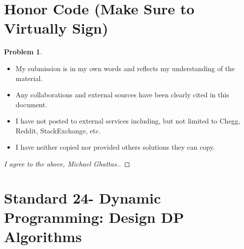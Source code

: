 \documentclass[11pt]{article}
\theoremstyle{definition}
\theoremstyle{definition}
\newtheorem{required}{Problem}
\theoremstyle{definition}
\begin{document}
\section{Honor Code (Make Sure to Virtually Sign)} \label{HonorCode}

\begin{required}
\begin{itemize}
\item My submission is in my own words and reflects my understanding of the material.
\item Any collaborations and external sources have been clearly cited in this document.
\item I have not posted to external services including, but not limited to Chegg, Reddit, StackExchange, etc.
\item I have neither copied nor provided others solutions they can copy.
\end{itemize}

\end{required}

\begin{proof}[I agree to the above, Michael Ghattas.]
\end{proof}


\newpage
\section{Standard 24- Dynamic Programming: Design DP Algorithms}
\end{document}
